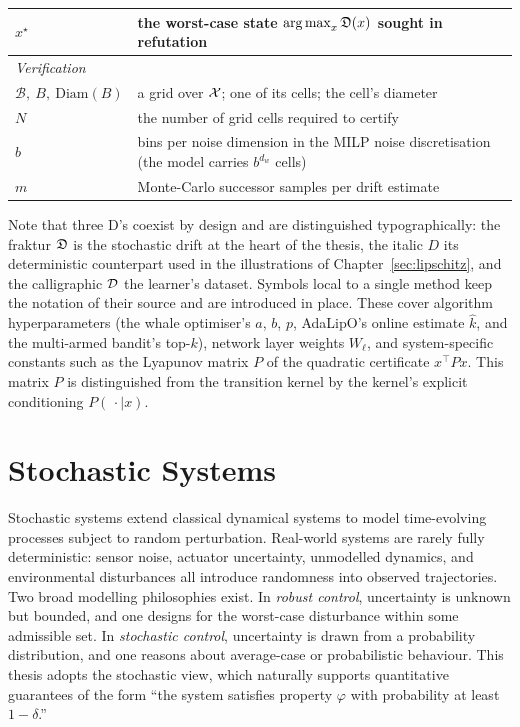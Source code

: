 \begin{center}
\begin{tabular}{lp{9.6cm}}
$x^\star$ & the worst-case state $\operatorname*{arg\,max}_{x} \mathfrak{D}(x)$ sought in refutation \\
\hline
\multicolumn{2}{l}{\emph{Verification}}\\
\hline
$\mathcal{B},\ B,\ \mathrm{Diam}(B)$ & a grid over $\mathcal{X}$; one of its cells; the cell's diameter \\
$N$ & the number of grid cells required to certify \\
$b$ & bins per noise dimension in the MILP noise discretisation (the model carries $b^{d_w}$ cells) \\
$m$ & Monte-Carlo successor samples per drift estimate \\
\hline
\end{tabular}
\normallinespacing
\end{center}

Note that three D's coexist by design and are distinguished typographically:
the fraktur $\mathfrak{D}$ is the stochastic drift at the heart of the thesis, the
italic $D$ its deterministic counterpart used in the illustrations of
Chapter~\ref{sec:lipschitz}, and the calligraphic $\mathcal{D}$ the learner's dataset.
Symbols local to a single method keep the notation of their source and are
introduced in place. These cover algorithm hyperparameters (the whale
optimiser's $a$, $b$, $p$, AdaLipO's online estimate $\hat{k}$, and the
multi-armed bandit's top-$k$), network layer weights $W_\ell$, and
system-specific constants such as the Lyapunov matrix $P$ of the quadratic
certificate $x^\top P x$. This matrix $P$ is distinguished from the transition
kernel by the kernel's explicit conditioning $P(\,\cdot \mid x)$.

\section{Stochastic Systems}

Stochastic systems extend classical dynamical systems to model time-evolving processes subject to
random perturbation. Real-world systems are rarely fully deterministic: sensor noise, actuator
uncertainty, unmodelled dynamics, and environmental disturbances all introduce randomness into
observed trajectories. Two broad modelling philosophies exist. In \textit{robust control},
uncertainty is unknown but bounded, and one designs for the worst-case disturbance within some
admissible set. In \textit{stochastic control}, uncertainty is drawn from a probability
distribution, and one reasons about average-case or probabilistic behaviour. This thesis adopts
the stochastic view, which naturally supports quantitative guarantees of the form ``the system
satisfies property $\varphi$ with probability at least $1 - \delta$.''

